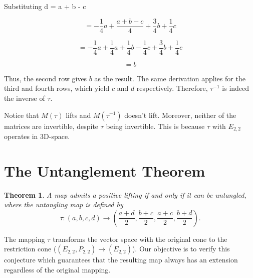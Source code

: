 \documentclass[11pt]{amsart}
\newtheorem{thm}{Theorem}[section]
\theoremstyle{definition}
\begin{document}
Substituting d = a + b - c

\[
= -\frac{1}{4}a + \frac{a + b - c}{4} + \frac{3}{4}b + \frac{1}{4}c 
\]

\[
= -\frac{1}{4}a + \frac{1}{4}a + \frac{1}{4}b - \frac{1}{4}c + \frac{3}{4}b + \frac{1}{4}c 
\]

\[
= b
\]

Thus, the second row gives $b$ as the result. The same derivation applies for the third and fourth rows, which yield $c$ and $d$ respectively. Therefore, $\tau^{-1}$ is indeed the inverse of $\tau$.

Notice that $M(\tau)$ lifts and $M(\tau^{-1})$ doesn't lift. Moreover, neither of the matrices are invertible, despite $\tau$ being invertible. This is because \(\tau\) with $E_{2,2}$ operates in 3D-space.

\section{The Untanglement Theorem}

\begin{thm}
    A map admits a positive lifting if and only if it can be untangled, where the untangling map is defined by
\[
\tau: (a,b,c,d) \to \left( \frac{a+d}{2}, \frac{b+c}{2}, \frac{a+c}{2}, \frac{b+d}{2} \right).
\]
\end{thm} 

The mapping \(\tau\) transforms the vector space with the original cone to the restriction cone (\((E_{2,2},P_{2,2}) \to (E_{2,2})\)). Our objective is to verify this conjecture which guarantees that the resulting map always has an extension regardless of the original mapping.
\end{document}
